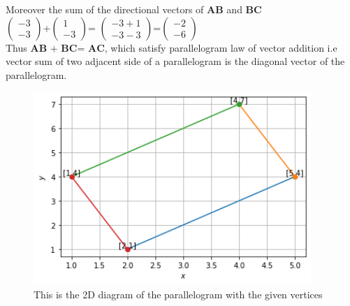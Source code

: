 \documentclass[journal,12pt,twocolumn]{IEEEtran}
\newcommand{\myvec}[1]{\ensuremath{\begin{pmatrix}#1\end{pmatrix}}}
\numberwithin{equation}{subsection}
\let\vec\mathbf
\begin{document}
Moreover the sum of the directional vectors of $\vec{AB}$ and $\vec{BC}$ \\
  
\myvec{-3\\-3}+\myvec{1 \\-3}= \myvec{-3+1 \\-3-3}=\myvec{-2 \\-6}\\

Thus $\vec{AB}$ $+$ $\vec{BC}$= $\vec{AC}$, which satisfy
parallelogram law of vector addition i.e vector
sum of two adjacent side of a parallelogram is the
diagonal vector of the parallelogram.
\begin{figure}[!]
 \begin{center}
  \includegraphics[width=10.5cm]{assignment2/assignment2_fig.png}
    \caption{This is the 2D diagram of the parallelogram with the given vertices}
    \label{myfig:1}
    \end{center}
\end{figure}
\end{document}

